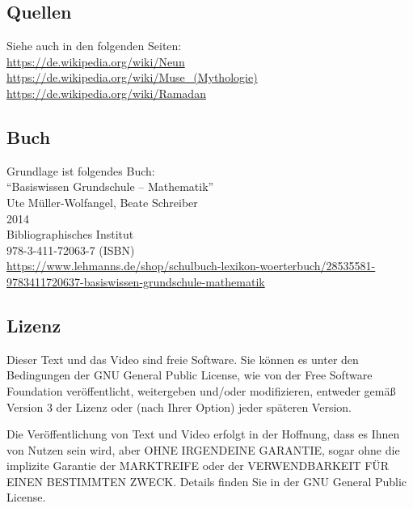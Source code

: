 \documentclass[a4paper]{amsart}
\theoremstyle{definition}
\begin{document}
\subsection*{Quellen}
Siehe auch in den folgenden Seiten:\\
\url{https://de.wikipedia.org/wiki/Neun}\\
\url{https://de.wikipedia.org/wiki/Muse_(Mythologie)}\\
\url{https://de.wikipedia.org/wiki/Ramadan}\\

\subsection*{Buch}
Grundlage ist folgendes Buch:\\
"`Basiswissen Grundschule – Mathematik"'\\
Ute Müller-Wolfangel, Beate Schreiber\\
2014\\
Bibliographisches Institut\\
978-3-411-72063-7 (ISBN)
\\
\url{https://www.lehmanns.de/shop/schulbuch-lexikon-woerterbuch/28535581-9783411720637-basiswissen-grundschule-mathematik}

\subsection*{Lizenz}
Dieser Text und das Video sind freie Software. Sie können es unter den Bedingungen der 
GNU General Public License, wie von der Free Software Foundation veröffentlicht, weitergeben 
und/oder modifizieren, entweder gemäß Version 3 der Lizenz oder (nach Ihrer Option) jeder späteren Version.

Die Veröffentlichung von Text und Video erfolgt in der Hoffnung, dass es Ihnen von Nutzen sein wird, 
aber OHNE IRGENDEINE GARANTIE, sogar ohne die implizite Garantie der MARKTREIFE oder der 
VERWENDBARKEIT FÜR EINEN BESTIMMTEN ZWECK. Details finden Sie in der GNU General Public License.
\end{document}
